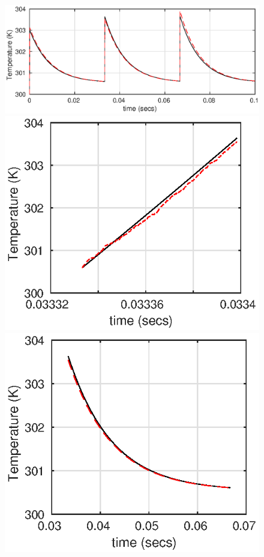 \begin{figure} 
\includegraphics[scale=0.9]{gfx/sol_several_pulses_noise.eps} 
\includegraphics[scale=0.9]{gfx/sol_int_time_noise.eps}  
\includegraphics[scale=0.9]{gfx/sol_cooling_noise.eps}

\end{figure}
